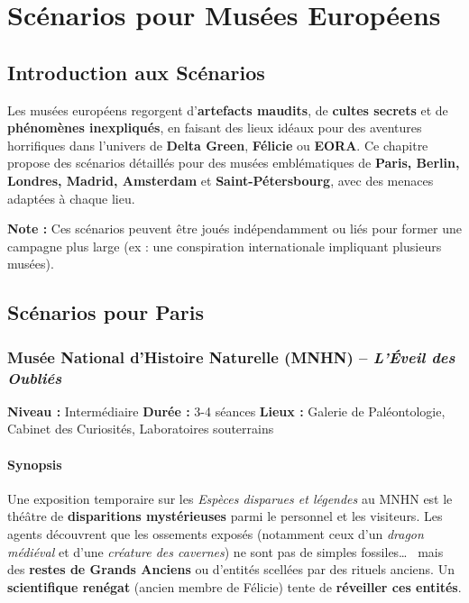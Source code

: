 \documentclass[10pt,a5paper,twoside]{book}
\begin{document}

\chapter{Scénarios pour Musées Européens}

\section*{Introduction aux Scénarios}

Les musées européens regorgent d'\textbf{artefacts maudits}, de \textbf{cultes secrets} et de \textbf{phénomènes inexpliqués}, en faisant des lieux idéaux pour des aventures horrifiques dans l'univers de \textbf{Delta Green}, \textbf{Félicie} ou \textbf{EORA}.
Ce chapitre propose des scénarios détaillés pour des musées emblématiques de \textbf{Paris, Berlin, Londres, Madrid, Amsterdam} et \textbf{Saint-Pétersbourg}, avec des menaces adaptées à chaque lieu.

\begin{shaded}
\textbf{Note :} Ces scénarios peuvent être joués indépendamment ou liés pour former une campagne plus large (ex : une conspiration internationale impliquant plusieurs musées).
\end{shaded}


\section{Scénarios pour Paris}

\newpage

\subsection{Musée National d'Histoire Naturelle (MNHN) -- \textit{L'Éveil des Oubliés}}

\begin{shaded}
	\textbf{Niveau :} Intermédiaire \quad
	\textbf{Durée :} 3-4 séances \quad
	\textbf{Lieux :} Galerie de Paléontologie, Cabinet des Curiosités, Laboratoires souterrains
\end{shaded}

\subsubsection*{Synopsis}
Une exposition temporaire sur les \textit{Espèces disparues et légendes} au MNHN est le théâtre de \textbf{disparitions mystérieuses} parmi le personnel et les visiteurs. Les agents découvrent que les ossements exposés (notamment ceux d'un \textit{dragon médiéval} et d'une \textit{créature des cavernes}) ne sont pas de simples fossiles\ldots~  mais des \textbf{restes de Grands Anciens} ou d'entités scellées par des rituels anciens. Un \textbf{scientifique renégat} (ancien membre de Félicie) tente de \textbf{réveiller ces entités}.
\end{document}
